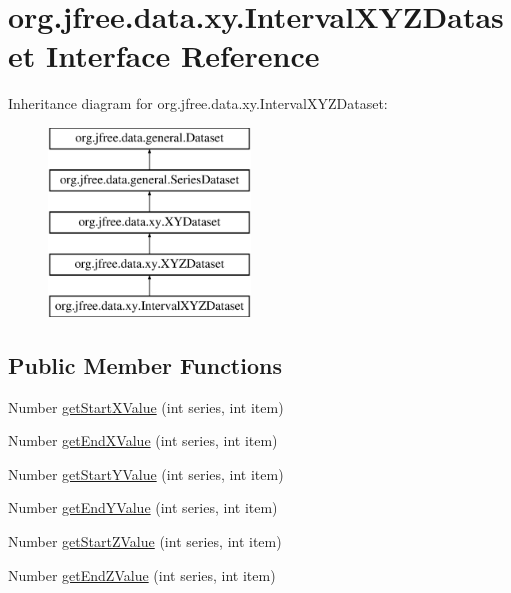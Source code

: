 \hypertarget{interfaceorg_1_1jfree_1_1data_1_1xy_1_1_interval_x_y_z_dataset}{}\section{org.\+jfree.\+data.\+xy.\+Interval\+X\+Y\+Z\+Dataset Interface Reference}
\label{interfaceorg_1_1jfree_1_1data_1_1xy_1_1_interval_x_y_z_dataset}
Inheritance diagram for org.\+jfree.\+data.\+xy.\+Interval\+X\+Y\+Z\+Dataset\+:\begin{figure}[H]
\begin{center}
\leavevmode
\includegraphics[height=5.000000cm]{interfaceorg_1_1jfree_1_1data_1_1xy_1_1_interval_x_y_z_dataset}
\end{center}
\end{figure}
\subsection*{Public Member Functions}
\begin{DoxyCompactItemize}
\item 
Number \mbox{\hyperlink{interfaceorg_1_1jfree_1_1data_1_1xy_1_1_interval_x_y_z_dataset_aa5815ef78ab95b0d134c0b7a063bf955}{get\+Start\+X\+Value}} (int series, int item)
\item 
Number \mbox{\hyperlink{interfaceorg_1_1jfree_1_1data_1_1xy_1_1_interval_x_y_z_dataset_a2751b04f228ec1092fd984ad6aeae847}{get\+End\+X\+Value}} (int series, int item)
\item 
Number \mbox{\hyperlink{interfaceorg_1_1jfree_1_1data_1_1xy_1_1_interval_x_y_z_dataset_ae30382e9a7465720784e27e3102518a7}{get\+Start\+Y\+Value}} (int series, int item)
\item 
Number \mbox{\hyperlink{interfaceorg_1_1jfree_1_1data_1_1xy_1_1_interval_x_y_z_dataset_a384139522f1ca2ee7a65173b2474db99}{get\+End\+Y\+Value}} (int series, int item)
\item 
Number \mbox{\hyperlink{interfaceorg_1_1jfree_1_1data_1_1xy_1_1_interval_x_y_z_dataset_a6d10d8a41f3f2226fadefa51277f2c9f}{get\+Start\+Z\+Value}} (int series, int item)
\item 
Number \mbox{\hyperlink{interfaceorg_1_1jfree_1_1data_1_1xy_1_1_interval_x_y_z_dataset_abefbe8d4cd15bbb6ce228498fe7f4122}{get\+End\+Z\+Value}} (int series, int item)
\end{DoxyCompactItemize}


